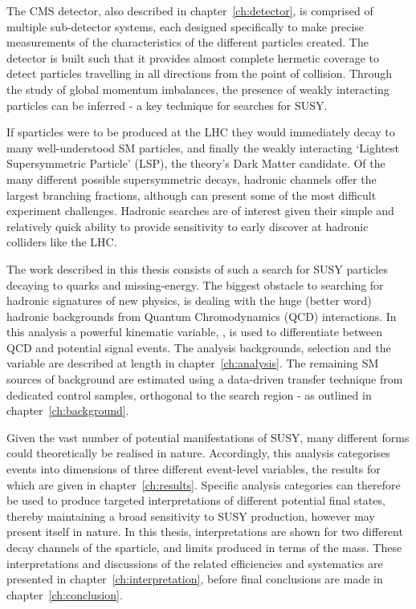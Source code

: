 The CMS detector, also described in chapter~\ref{ch:detector}, is comprised of
multiple sub-detector systems, each designed
specifically to make precise measurements of the characteristics of the
different particles created. The detector is built such that it provides almost
complete hermetic coverage to detect particles travelling in all directions
from the point of collision. Through the study of global momentum imbalances,
the presence of weakly interacting particles can be inferred - a key technique
for searches for SUSY.

If sparticles were to be produced at the LHC they would immediately decay to
many well-understood SM particles, and finally the weakly interacting `Lightest
Supersymmetric Particle' (LSP), the theory's Dark Matter candidate. Of the many
different possible supersymmetric decays, hadronic channels offer the largest
branching fractions, although can present some of the most difficult experiment
challenges. Hadronic searches are of interest given their simple and relatively
quick ability to provide sensitivity to early discover at hadronic colliders
like the LHC.

The work described in this thesis consists of such a search for SUSY particles
decaying to quarks and missing-energy. The biggest obstacle to
searching for hadronic signatures of new physics, is dealing with the huge
(better word) hadronic backgrounds from Quantum Chromodynamics (QCD)
interactions. In this
analysis a powerful kinematic variable, \alphat, is used to differentiate
between QCD and potential signal events. The analysis backgrounds, selection and
the \alphat variable are described at length in chapter~\ref{ch:analysis}. The
remaining SM sources of background
are estimated using a data-driven transfer technique from dedicated control
samples, orthogonal to the search region - as outlined in
chapter~\ref{ch:background}.

Given the vast number of potential manifestations of SUSY, many different forms
could theoretically be realised in nature. Accordingly, this analysis
categorises events into dimensions of three different event-level variables,
the results for which are given in chapter~\ref{ch:results}.
Specific analysis categories can therefore be used to produce targeted
interpretations of different potential final states, thereby maintaining a broad
sensitivity to SUSY production, however may present itself in nature. In this
thesis,
interpretations are shown for two different decay channels of the \sTop
sparticle, and limits produced in terms of the \sTop mass. These interpretations
and discussions of the related efficiencies and systematics are presented in
chapter~\ref{ch:interpretation}, before final conclusions are made in
chapter~\ref{ch:conclusion}.

